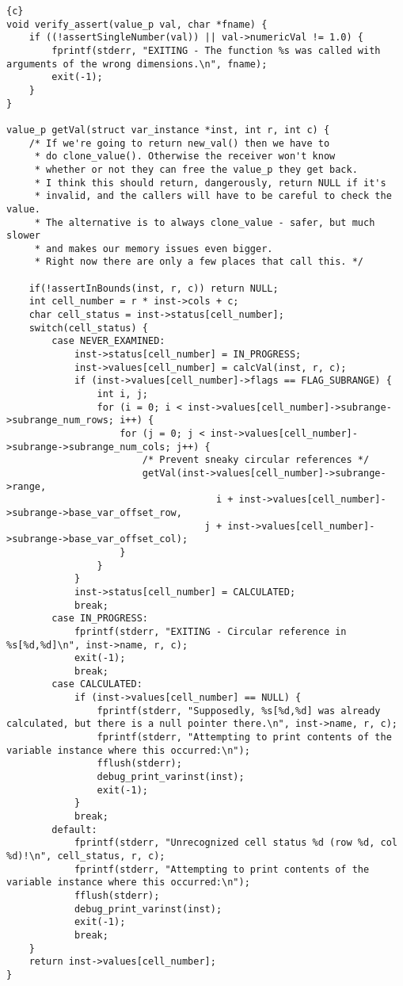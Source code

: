 \begin{lstlisting}{c}
void verify_assert(value_p val, char *fname) {
	if ((!assertSingleNumber(val)) || val->numericVal != 1.0) {
		fprintf(stderr, "EXITING - The function %s was called with arguments of the wrong dimensions.\n", fname);
		exit(-1);
	}
}

value_p getVal(struct var_instance *inst, int r, int c) {
	/* If we're going to return new_val() then we have to
	 * do clone_value(). Otherwise the receiver won't know
	 * whether or not they can free the value_p they get back.
	 * I think this should return, dangerously, return NULL if it's
	 * invalid, and the callers will have to be careful to check the value.
	 * The alternative is to always clone_value - safer, but much slower
	 * and makes our memory issues even bigger.
	 * Right now there are only a few places that call this. */

	if(!assertInBounds(inst, r, c)) return NULL;
	int cell_number = r * inst->cols + c;
	char cell_status = inst->status[cell_number];
	switch(cell_status) {
		case NEVER_EXAMINED:
			inst->status[cell_number] = IN_PROGRESS;
			inst->values[cell_number] = calcVal(inst, r, c);
			if (inst->values[cell_number]->flags == FLAG_SUBRANGE) {
				int i, j;
				for (i = 0; i < inst->values[cell_number]->subrange->subrange_num_rows; i++) {
					for (j = 0; j < inst->values[cell_number]->subrange->subrange_num_cols; j++) {
						/* Prevent sneaky circular references */
						getVal(inst->values[cell_number]->subrange->range,
									 i + inst->values[cell_number]->subrange->base_var_offset_row,
								   j + inst->values[cell_number]->subrange->base_var_offset_col);
					}
				}
			}
			inst->status[cell_number] = CALCULATED;
			break;
		case IN_PROGRESS:
			fprintf(stderr, "EXITING - Circular reference in %s[%d,%d]\n", inst->name, r, c);
			exit(-1);
			break;
		case CALCULATED:
			if (inst->values[cell_number] == NULL) {
				fprintf(stderr, "Supposedly, %s[%d,%d] was already calculated, but there is a null pointer there.\n", inst->name, r, c);
				fprintf(stderr, "Attempting to print contents of the variable instance where this occurred:\n");
				fflush(stderr);
				debug_print_varinst(inst);
				exit(-1);
			}
			break;
		default:
			fprintf(stderr, "Unrecognized cell status %d (row %d, col %d)!\n", cell_status, r, c);
			fprintf(stderr, "Attempting to print contents of the variable instance where this occurred:\n");
			fflush(stderr);
			debug_print_varinst(inst);
			exit(-1);
			break;
	}
	return inst->values[cell_number];
}
\end{lstlisting}

